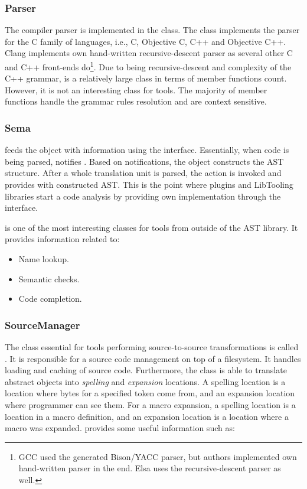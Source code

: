 \subsubsection{Parser}
The compiler parser is implemented in the  class. The class implements the parser for the C family of languages, i.e., C, Objective C, C++ and Objective C++. Clang implements own hand-written recursive-descent parser as several other C and C++ front-ends do\footnote{GCC used the generated Bison/YACC parser, but authors implemented own hand-written parser in the end. Elsa uses the recursive-descent parser as well.}. Due to being recursive-descent and complexity of the C++ grammar,  is a relatively large class in terms of member functions count. However, it is not an interesting class for tools. The majority of member functions handle the grammar rules resolution and are context sensitive.

\subsubsection{Sema}
 feeds the  object with information using the  interface. Essentially, when code is being parsed,  notifies . Based on notifications, the  object constructs the AST structure. After a whole translation unit is parsed, the  action is invoked and  provides  with constructed AST. This is the point where plugins and LibTooling libraries start a code analysis by providing own  implementation through the  interface.

 is one of the most interesting classes for tools from outside of the AST library. It provides information related to:

\begin{itemize}
\item Name lookup.
\item Semantic checks.
\item Code completion.
\end{itemize}

\subsubsection{SourceManager}
The class essential for tools performing source-to-source transformations is called . It is responsible for a source code management on top of a filesystem. It handles loading and caching of source code. Furthermore, the class is able to translate abstract  objects into \emph{spelling} and \emph{expansion} locations. A spelling location is a location where bytes for a specified token come from, and an expansion location where programmer can see them. For a macro expansion, a spelling location is a location in a macro definition, and an expansion location is a location where a macro was expanded.  provides some useful information such as:

